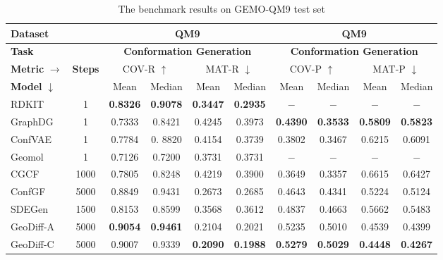 \documentclass{article} %
\begin{document}
\begin{table}[htbp]
	\centering
	\scriptsize
	\caption{The benchmark results on GEMO-QM9 test set}
	\begin{threeparttable}
		\begin{tabular}{l|c|cccc|cccc}
			\toprule
			\textbf{Dataset} &  &   \multicolumn{4}{c|}{\textbf{QM9}} & \multicolumn{4}{c}{\textbf{QM9}} \\
			\midrule
			\textbf{Task} &  &    \multicolumn{4}{c|}{\textbf{Conformation Generation}} & \multicolumn{4}{c}{\textbf{Conformation Generation}} \\
			\midrule
			\multicolumn{1}{l|}{\textbf{Metric} $\rightarrow$} & \multirow{2}[1]{*}{\textbf{Steps}} & \multicolumn{2}{c}{COV-R $\uparrow$} & \multicolumn{2}{c|}{MAT-R $\downarrow$} & \multicolumn{2}{c}{COV-P $\uparrow$} & \multicolumn{2}{c}{MAT-P $\downarrow$} \\
			\multicolumn{1}{l|}{\textbf{Model} $\downarrow$} &  &  Mean  & Median & Mean  & Median & Mean  & Median & Mean  & Median \\
			\midrule
			RDKIT & 1       &        \textbf{0.8326 } & \textbf{0.9078 } & \textbf{0.3447 } & \textbf{0.2935 } & $-$     & $-$     & $-$      & $-$  \\
			GraphDG & 1     &        0.7333  & 0.8421  & 0.4245  & 0.3973  & \textbf{0.4390 } & \textbf{0.3533 } & \textbf{0.5809 } & \textbf{0.5823 } \\
			ConfVAE & 1     &        0.7784  & 0. 8820 & 0.4154  & 0.3739  & 0.3802  & 0.3467  & 0.6215  & 0.6091  \\
			Geomol & 1      &        0.7126  & 0.7200  & 0.3731  & 0.3731  & $-$      & $-$      & $-$      & $-$  \\
			\midrule
			CGCF  & 1000        &    0.7805  & 0.8248  & 0.4219  & 0.3900  & 0.3649  & 0.3357  & 0.6615  & 0.6427  \\
			ConfGF & 5000       &    0.8849  & 0.9431  & 0.2673  & 0.2685  & 0.4643  & 0.4341  & 0.5224  & 0.5124  \\
			SDEGen\tnote{$a$}  & 1500       &    0.8153  & 0.8599  & 0.3568  & 0.3612  & 0.4837  & 0.4663  & 0.5662  & 0.5483  \\
			GeoDiff-A\tnote{$b$}  & 5000    &    \textbf{0.9054 } & \textbf{0.9461 } & 0.2104  & 0.2021  & 0.5235  & 0.5010  & 0.4539  & 0.4399  \\
			GeoDiff-C\tnote{$c$}  & 5000    &    0.9007  & 0.9339  & \textbf{0.2090 } & \textbf{0.1988 } & \textbf{0.5279 } & \textbf{0.5029 } & \textbf{0.4448 } & \textbf{0.4267 } \\

\end{tabular}
\end{threeparttable}
\end{table}
\end{document}
